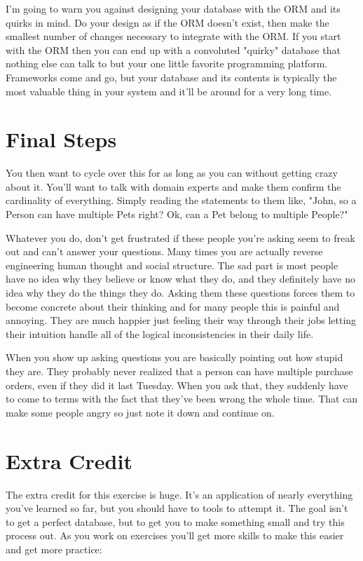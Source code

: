 I'm going to warn you against designing your database with the ORM and its quirks in mind.  Do your
design as if the ORM doesn't exist, then make the smallest number of changes necessary to integrate
with the ORM.  If you start with the ORM then you can end up with a convoluted "quirky" database that
nothing else can talk to but your one little favorite programming platform.  Frameworks come and
go, but your database and its contents is typically the most valuable thing in your system and 
it'll be around for a very long time.

\section{Final Steps}

You then want to cycle over this for as long as you can without getting crazy about it.  You'll want
to talk with domain experts and make them confirm the cardinality of everything.  Simply reading the
statements to them like, "John, so a Person can have multiple Pets right?  Ok, can a Pet belong
to multiple People?"

Whatever you do, don't get frustrated if these people you're asking seem to freak out and can't answer
your questions.  Many times you are actually reverse engineering human thought and social structure.  The sad
part is most people have no idea why they believe or know what they do, and they definitely have no 
idea why they do the things they do.  Asking them these questions forces them to become concrete 
about their thinking and for many people this is painful and annoying.  They are much happier just
feeling their way through their jobs letting their intuition handle all of the logical inconsistencies
in their daily life.

When you show up asking questions you are basically pointing out how stupid they are.  They probably
never realized that a person can have multiple purchase orders, even if they did it last Tuesday.  When
you ask that, they suddenly have to come to terms with the fact that they've been wrong the whole time.
That can make some people angry so just note it down and continue on.

\section{Extra Credit}

The extra credit for this exercise is huge.  It's an application of nearly everything
you've learned so far, but you should have to tools to attempt it.  The goal isn't
to get a perfect database, but to get you to make something small and try this process out.  As
you work on exercises you'll get more skills to make this easier and get more practice:

